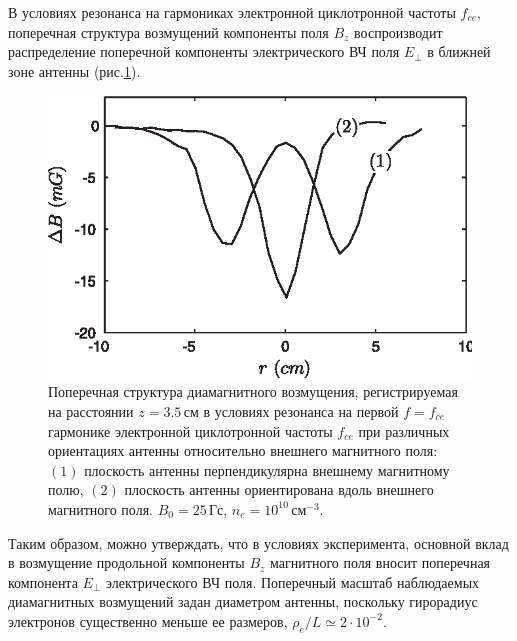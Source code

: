 \documentclass[autoref,10pt]{disser}
\begin{document}
В условиях резонанса на гармониках электронной циклотронной частоты $f_{ce}$, поперечная структура возмущений компоненты поля $B_{z}$  воспроизводит распределение поперечной компоненты электрического ВЧ поля $E_{\perp}$ в ближней зоне антенны (\mbox{рис.\ref{fig:tr+par_distr}}).
\begin{figure}[H]
    \centering
    \includegraphics*[width=0.7\columnwidth]{pics/tr+par_distr.eps}
    \caption{Поперечная структура диамагнитного возмущения, регистрируемая на расстоянии $z=3.5$\,см в условиях резонанса на первой $f=f_{ce}$  гармонике электронной циклотронной частоты $f_{ce}$ при различных ориентациях антенны относительно внешнего магнитного поля: $(1)$ плоскость антенны перпендикулярна внешнему магнитному полю, $(2)$ плоскость антенны ориентирована вдоль внешнего магнитного поля. $B_{0}=25$\,Гс, $n_{e}=10^{10}$\,см$^{-3}$.}
    \label{fig:tr+par_distr}
\end{figure}

Таким образом, можно утверждать, что в условиях эксперимента, основной вклад в возмущение продольной компоненты  $B_{z}$ магнитного поля вносит поперечная компонента $E_{\perp}$ электрического ВЧ поля. Поперечный масштаб наблюдаемых диамагнитных возмущений задан диаметром антенны, поскольку гирорадиус электронов существенно меньше ее размеров, $\rho_e/L \simeq2\cdot 10^{-2}$. 
\end{document}
